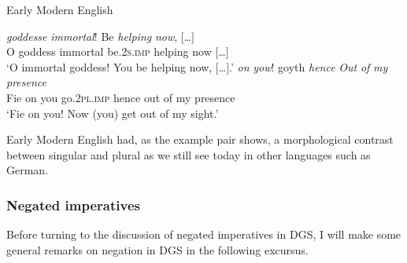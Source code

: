 \begin{exe}
\ex Early Modern English \citep[25]{rupp2002syntax}\label{impearlymodernenglish}\begin{xlist} 
\ex {} {\textit{goddesse}} {\textit{immortal}!} {Be} {\textit{helping}} {\textit{now},} {$[$\dots$]$}  \\
{O} {goddess} {immortal} {be.\textsc{2s.imp}} {helping} {now} {$[$\dots$]$} \\
\trans `O immortal goddess! You be helping now, $[$\dots$]$.' \label{ex:impearlymodernenglisha}
\ex {} {\textit{on}} {\textit{yow}!} {goyth} {\textit{hence}} {\textit{Out}} {\textit{of}} {\textit{my}} {\textit{presence}}   \\
{Fie} {on} {you} {go.\textsc{2pl.imp}} {hence} {out} {of} {my} {presence} \\
\trans `Fie on you! Now (you) get out of my sight.' \label{ex:impearlymodernenglishb}
\end{xlist}
\end{exe}

\noindent Early Modern English had, as the example pair shows, a morphological contrast between singular and plural as we still see today in other languages such as German. 

\subsubsection{Negated imperatives}
Before turning to the discussion of negated imperatives in DGS, I will make some general remarks on negation in DGS in the following excursus.\label{negationnegaation}


